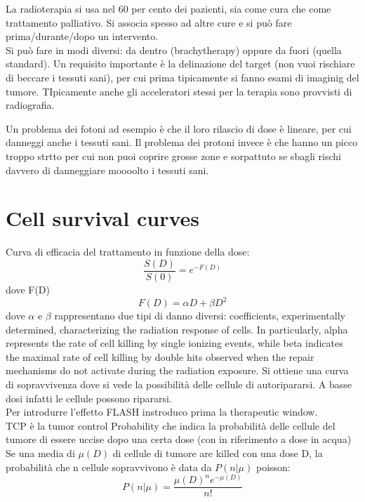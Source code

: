La radioterapia si usa nel 60 per cento dei pazienti, sia come cura che come trattamento palliativo. Si associa spesso ad altre cure e si può fare prima/durante/dopo un intervento.\\

Si può fare in modi diversi: da dentro (brachytherapy) oppure da fuori (quella standard). Un requisito importante è la delinazione del target (non vuoi rischiare di beccare i tessuti sani), per cui prima tipicamente si fanno esami di imaginig del tumore. TIpicamente anche gli acceleratori stessi per la terapia sono provvisti di radiografia.

Un problema dei fotoni ad esempio è che il loro rilascio di dose è lineare, per cui danneggi anche i tessuti sani. Il problema dei protoni invece è che hanno un picco troppo strtto per cui non puoi coprire grosse zone e sorpattuto se sbagli rischi davvero di danneggiare moooolto i tessuti sani.\\

\section{Cell survival curves}
Curva di efficacia del trattamento in funzione della dose:
\begin{equation}
    \frac{S(D)}{S(0)}=e^{-F(D)}
\end{equation} 
dove F(D)   
\begin{equation}
    F(D) = \alpha D + \beta D^2
\end{equation} 
dove $\alpha$ e $\beta$ rappresentano due tipi di danno diversi: coefficients, experimentally determined, characterizing the
radiation response of cells. In particularly, alpha represents the rate of cell killing
by single ionizing events, while beta indicates the maximal rate of cell killing by
double hits observed when the repair mechanisms do not activate during the
radiation exposure.
Si ottiene una curva di sopravvivenza dove si vede la possibilità delle cellule di autoripararsi. A basse dosi infatti le cellule possono ripararsi.\\

Per introdurre l'effetto FLASH instroduco prima la therapeutic window.  \\

TCP è la tumor control Probability che indica la probabilità delle cellule del tumore di essere uccise dopo una certa dose (con in riferimento a dose in acqua)\\
Se una media di $\mu(D)$ di cellule di tumore are killed con una dose D, la probabilità che n cellule sopravvivono è data da $P(n|\mu)$ poisson:
\begin{equation}
    P(n|\mu) = \frac{\mu(D)^ne^{-\mu(D)}}{n!}
\end{equation}    

